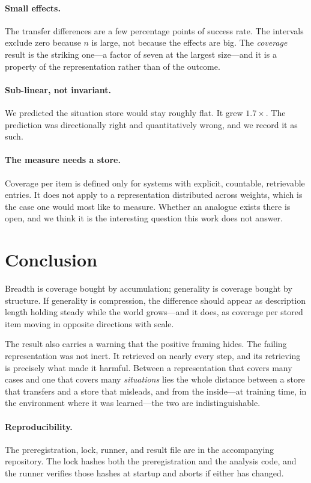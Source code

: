 \documentclass[11pt]{article}
\begin{document}
\paragraph{Small effects.} The transfer differences are a few percentage points
of success rate. The intervals exclude zero because $n$ is large, not because
the effects are big. The \emph{coverage} result is the striking one---a factor
of seven at the largest size---and it is a property of the representation rather
than of the outcome.

\paragraph{Sub-linear, not invariant.} We predicted the situation store would
stay roughly flat. It grew $1.7\times$. The prediction was directionally right
and quantitatively wrong, and we record it as such.

\paragraph{The measure needs a store.} Coverage per item is defined only for
systems with explicit, countable, retrievable entries. It does not apply to a
representation distributed across weights, which is the case one would most
like to measure. Whether an analogue exists there is open, and we think it is
the interesting question this work does not answer.

\section{Conclusion}

Breadth is coverage bought by accumulation; generality is coverage bought by
structure. If generality is compression, the difference should appear as
description length holding steady while the world grows---and it does, as
coverage per stored item moving in opposite directions with scale.

The result also carries a warning that the positive framing hides. The failing
representation was not inert. It retrieved on nearly every step, and its
retrieving is precisely what made it harmful. Between a representation that
covers many cases and one that covers many \emph{situations} lies the whole
distance between a store that transfers and a store that misleads, and from the
inside---at training time, in the environment where it was learned---the two are
indistinguishable.

\paragraph{Reproducibility.} The preregistration, lock, runner, and result file
are in the accompanying repository. The lock hashes both the preregistration
and the analysis code, and the runner verifies those hashes at startup and
aborts if either has changed.
\end{document}
